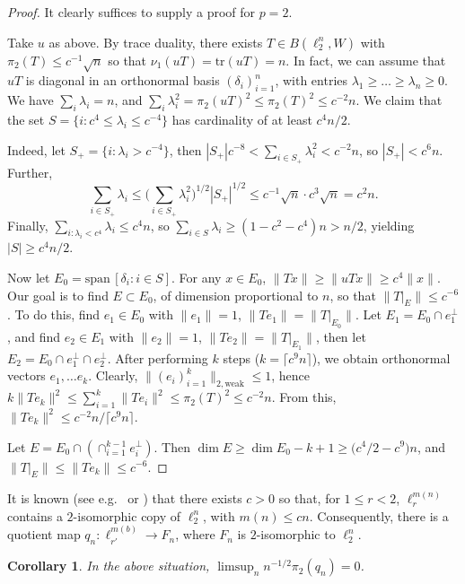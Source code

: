 \documentclass{amsart}
\theoremstyle{plain}
\newtheorem{corollary}[theorem]{Corollary}
\theoremstyle{definition}
\numberwithin{equation}{section}
\newcommand{\spn}{\textrm{span}\,}
\begin{document}
\begin{proof}
It clearly suffices to supply a proof for $p=2$.

Take $u$ as above. By trace duality, there exists $T \in B(\ell_2^n,W)$ with $\pi_2(T) \leq c^{-1} \sqrt{n}$ so that $\nu_1(uT) = {\textrm{tr}}(uT) = n$. In fact, we can assume that $uT$ is diagonal in an orthonormal basis $(\delta_i)_{i=1}^n$, with entries $\lambda_1 \geq \ldots \geq \lambda_n \geq 0$.
We have $\sum_i \lambda_i = n$, and $\sum_i \lambda_i^2 = \pi_2(uT)^2 \leq \pi_2(T)^2 \leq c^{-2} n$. We claim that the set $S = \{i : c^4 \leq \lambda_i \leq c^{-4}\}$ has cardinality of at least $c^4 n/2$. 

Indeed, let $S_+ = \{i : \lambda_i > c^{-4}\}$, then $|S_+| c^{-8} < \sum_{i \in S_+} \lambda_i^2 < c^{-2} n$, so $|S_+| < c^6 n$. Further, 
$$
\sum_{i \in S_+} \lambda_i \leq \big( \sum_{i \in S_+} \lambda_i^2 \big)^{1/2} |S_+|^{1/2} \leq c^{-1} \sqrt{n} \cdot c^3 \sqrt{n} = c^2 n .
$$
Finally, $\sum_{i : \lambda_i < c^4} \lambda_i \leq c^4 n$, so $\sum_{i \in S} \lambda_i \geq (1 - c^2 - c^4) n > n/2$, yielding $|S| \geq c^4 n/2$.

Now let $E_0 = \spn[\delta_i : i \in S]$. For any $x \in E_0$, $\|Tx\| \geq \|uTx\| \geq c^4 \|x\|$. Our goal is to find $E \subset E_0$, of dimension proportional to $n$, so that $\|T|_E\| \leq c^{-6}$.
To do this, find $e_1 \in E_0$ with $\|e_1\| = 1$, $\|T e_1\| = \|T|_{E_0}\|$. Let $E_1 = E_0 \cap e_1^\perp$, and find $e_2 \in E_1$ with $\|e_2\| = 1$, $\|T e_2\| = \|T|_{E_1}\|$, then let $E_2 = E_0 \cap e_1^\perp \cap e_2^{\perp}$. 
After performing $k$ steps ($k = \lceil c^9 n \rceil$), we obtain orthonormal vectors $e_1, \ldots e_k$. Clearly, $\|(e_i)_{i=1}^k\|_{2,{\textrm{weak}}} \leq 1$, hence $k \|Te_k\|^2 \leq \sum_{i=1}^k \|T e_i\|^2 \leq \pi_2(T)^2 \leq c^{-2} n$. From this, $\|Te_k\|^2 \leq c^{-2} n/\lceil c^9 n \rceil$.

Let $E = E_0 \cap (\cap_{i=1}^{k-1} e_i^\perp)$. Then $\dim E \geq \dim E_0 - k + 1 \geq \big( c^4/2 - c^9) n$, and $\|T|_E\| \leq \|Te_k\| \leq c^{-6}$.
\end{proof}


It is known (see e.g.~\cite{FLM} or \cite[Section 5]{MS}) that there exists $c > 0$ so that, for $1 \leq r < 2$, $\ell_r^{m(n)}$ contains a $2$-isomorphic copy of $\ell_2^n$, with $m(n) \leq cn$. Consequently, there is a quotient map $q_n : \ell_{r'}^{m(b)} \to F_n$, where $F_n$ is $2$-isomorphic to $\ell_2^n$.

\begin{corollary}\label{bad liftings}
In the above situation, $\limsup_n n^{-1/2} \pi_2(q_n) = 0$.
\end{corollary}
\end{document}
